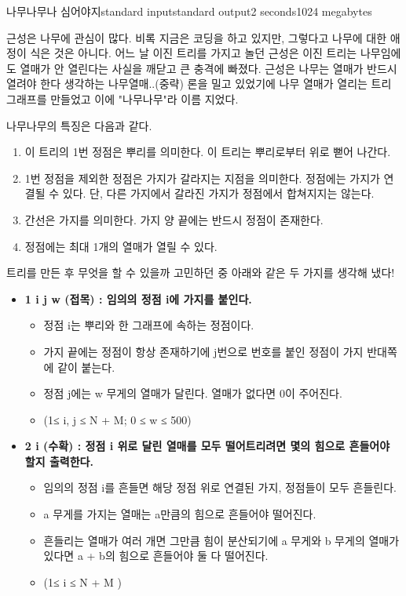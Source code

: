 \begin{problem}{나무나무나 심어야지}{standard input}{standard output}{2 seconds}{1024 megabytes}

근성은 나무에 관심이 많다.  
비록 지금은 코딩을 하고 있지만, 그렇다고 나무에 대한 애정이 식은 것은 아니다.
어느 날 이진 트리를 가지고 놀던 근성은 이진 트리는 나무임에도 열매가 안 열린다는 사실을 깨닫고 큰 충격에 빠졌다. 
근성은 나무는 열매가 반드시 열려야 한다 생각하는 나무열매..(중략) 론을 밀고 있었기에 나무 열매가 열리는 트리 그래프를 만들었고 이에 "나무나무"라 이름 지었다.

나무나무의 특징은 다음과 같다.
\begin{enumerate}
\item 이 트리의 1번 정점은 뿌리를 의미한다. 이 트리는 뿌리로부터 위로 뻗어 나간다.
\item 1번 정점을 제외한 정점은 가지가 갈라지는 지점을 의미한다. 정점에는 가지가 연결될 수 있다. 단, 다른 가지에서 갈라진 가지가 정점에서 합쳐지지는 않는다.
\item 간선은 가지를 의미한다. 가지 양 끝에는 반드시 정점이 존재한다.
\item 정점에는 최대 1개의 열매가 열릴 수 있다.
\end{enumerate}

트리를 만든 후 무엇을 할 수 있을까 고민하던 중 아래와 같은 두 가지를 생각해 냈다!
\begin{itemize}
  \item \bf{1 i j w  (접목)} : 임의의 정점 i에 가지를 붙인다.
    \begin{itemize}
      \item 정점 i는 뿌리와 한 그래프에 속하는 정점이다.
      \item 가지 끝에는 정점이 항상 존재하기에 j번으로 번호를 붙인 정점이 가지 반대쪽에 같이 붙는다.
      \item 정점 j에는 w 무게의 열매가 달린다. 열매가 없다면 0이 주어진다.
      \item (1≤ i, j ≤ N + M; 0 ≤ w ≤ 500)
    \end{itemize}
  \item \bf{2 i (수확)} : 정점 i 위로 달린 열매를 모두 떨어트리려면 몇의 힘으로 흔들어야 할지 출력한다.
    \begin{itemize}
      \item 임의의 정점 i를 흔들면 해당 정점 위로 연결된 가지, 정점들이 모두 흔들린다.  
      \item a 무게를 가지는 열매는 a만큼의 힘으로 흔들어야 떨어진다.
      \item 흔들리는 열매가 여러 개면 그만큼 힘이 분산되기에 a 무게와 b 무게의 열매가 있다면 a + b의 힘으로 흔들어야 둘 다 떨어진다.
      \item (1≤ i ≤ N + M )
    \end{itemize}
\end{itemize}



\end{problem}
